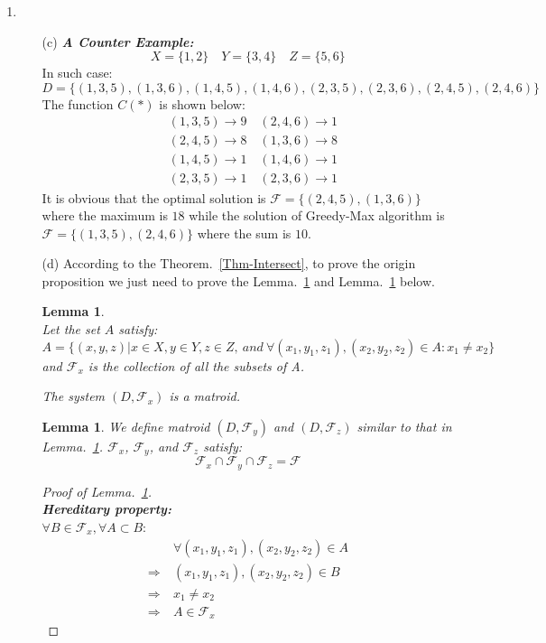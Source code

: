 \documentclass[12pt,a4paper]{article}
\makeatletter
\newtheorem{lemma}[theorem]{Lemma}
\newtheorem*{solution}{Solution}
\theoremstyle{definition}
\renewenvironment{solution}[1][Solution] {\par\pushQED{\qed}\normalfont\topsep6\p@\@plus6\p@\relax\trivlist\item[\hskip\labelsep\bfseries#1\@addpunct{.}]\ignorespaces}{\popQED\endtrivlist\@endpefalse} \makeatother
\makeatother
\begin{document}
\begin{enumerate}
\begin{enumerate}
\begin{solution}
\begin{enumerate}
    	    \item[(c)]
    	    \textbf{\textit{A Counter Example:}}
			\\    	    
    	    $$X=\{1,2\}\quad Y=\{3,4\} \quad Z=\{5,6\}$$
    	    In such case:
    	    $$D=\{(1,3,5),(1,3,6),(1,4,5),(1,4,6),(2,3,5),(2,3,6),(2,4,5),(2,4,6)\}$$
    	    The function $C(*)$ is shown below:
    	    \begin{equation}
    	    \begin{split}
    	    & (1,3,5)\rightarrow 9\quad    	     
    	     (2,4,6)\rightarrow 1\\ 
			& (2,4,5)\rightarrow 8\quad
			 (1,3,6)\rightarrow 8\\   	    
    	    & (1,4,5)\rightarrow 1\quad
    	     (1,4,6)\rightarrow 1\\
    	    & (2,3,5)\rightarrow 1\quad
    	     (2,3,6)\rightarrow 1
    	    \end{split}
    	    \end{equation}
    	    It is obvious that the optimal solution is $\mathcal{F}=\{(2,4,5),(1,3,6)\}$ where the maximum is $18$ while the solution of   Greedy-Max algorithm is $\mathcal{F}=\{(1,3,5),(2,4,6)\}$ where the sum is $10$.
    	    
    	    \item[(d)]
			According to the Theorem.~\ref{Thm-Intersect}, to prove the origin proposition we just need to prove the Lemma.~\ref{Lem-FxIsMatroid} and Lemma.~\ref{Lem-CupOfFxFyFzIsF} below.
			\begin{lemma}\label{Lem-FxIsMatroid}
			~\\
			Let the set $A$ satisfy:
			$$A=\{(x,y,z)|x\in X,y\in Y,z\in Z,\ and \ \forall (x_1,y_1,z_1),(x_2,y_2,z_2)\in A:x_1\neq x_2 \}$$
			and $\mathcal{F}_x$ is the collection of all the subsets of A.
			
			The system $(D,\mathcal{F}_x)$ is a matroid.
			\end{lemma}
			\begin{lemma}\label{Lem-CupOfFxFyFzIsF}
			We define matroid $(D,\mathcal{F}_y)$ and $(D,\mathcal{F}_z)$ similar to that in Lemma.~\ref{Lem-FxIsMatroid}.
			$\mathcal{F}_x$, $\mathcal{F}_y$, and $\mathcal{F}_z$ satisfy:
			$$\mathcal{F}_x\cap \mathcal{F}_y \cap \mathcal{F}_z = \mathcal{F}$$
			\end{lemma}
			\begin{proof}[Proof of Lemma.~\ref{Lem-FxIsMatroid}]
			~\\
			\textbf{\textit{Hereditary property:}}\\
			$\forall B \in \mathcal{F}_x, \forall A\subset B$:
			\begin{equation}\nonumber
			\begin{split}
			& \forall (x_1,y_1,z_1),(x_2,y_2,z_2)\in A\\
			\Rightarrow\ & (x_1,y_1,z_1),(x_2,y_2,z_2)\in B\\
			\Rightarrow\ & x_1\neq x_2\\
			\Rightarrow\ & A\in \mathcal{F}_x
			\end{split}
			\end{equation}
			

\end{proof}
\end{enumerate}
\end{solution}
\end{enumerate}
\end{enumerate}
\end{document}
